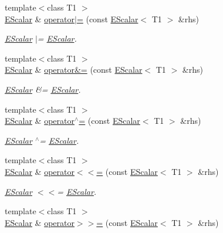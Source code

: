 \begin{DoxyCompactItemize}
{\footnotesize template$<$class T1 $>$ }\\\mbox{\hyperlink{classENSEM_1_1EScalar}{E\+Scalar}} \& \mbox{\hyperlink{classENSEM_1_1EScalar_a95469ba3db6456ae2fa0c6d86d082c0a}{operator$\vert$=}} (const \mbox{\hyperlink{classENSEM_1_1EScalar}{E\+Scalar}}$<$ T1 $>$ \&rhs)
\begin{DoxyCompactList}\small\item\em \mbox{\hyperlink{classENSEM_1_1EScalar}{E\+Scalar}} $\vert$= \mbox{\hyperlink{classENSEM_1_1EScalar}{E\+Scalar}}. \end{DoxyCompactList}\item 
{\footnotesize template$<$class T1 $>$ }\\\mbox{\hyperlink{classENSEM_1_1EScalar}{E\+Scalar}} \& \mbox{\hyperlink{classENSEM_1_1EScalar_a4e16e2cecacdfefd6f01dcc360c6945b}{operator\&=}} (const \mbox{\hyperlink{classENSEM_1_1EScalar}{E\+Scalar}}$<$ T1 $>$ \&rhs)
\begin{DoxyCompactList}\small\item\em \mbox{\hyperlink{classENSEM_1_1EScalar}{E\+Scalar}} \&= \mbox{\hyperlink{classENSEM_1_1EScalar}{E\+Scalar}}. \end{DoxyCompactList}\item 
{\footnotesize template$<$class T1 $>$ }\\\mbox{\hyperlink{classENSEM_1_1EScalar}{E\+Scalar}} \& \mbox{\hyperlink{classENSEM_1_1EScalar_a42c2a63d2eda81643ae8145068db3a8e}{operator$^\wedge$=}} (const \mbox{\hyperlink{classENSEM_1_1EScalar}{E\+Scalar}}$<$ T1 $>$ \&rhs)
\begin{DoxyCompactList}\small\item\em \mbox{\hyperlink{classENSEM_1_1EScalar}{E\+Scalar}} $^\wedge$= \mbox{\hyperlink{classENSEM_1_1EScalar}{E\+Scalar}}. \end{DoxyCompactList}\item 
{\footnotesize template$<$class T1 $>$ }\\\mbox{\hyperlink{classENSEM_1_1EScalar}{E\+Scalar}} \& \mbox{\hyperlink{classENSEM_1_1EScalar_a29ea96dc5698e4541307d65a0f1dfe6e}{operator$<$$<$=}} (const \mbox{\hyperlink{classENSEM_1_1EScalar}{E\+Scalar}}$<$ T1 $>$ \&rhs)
\begin{DoxyCompactList}\small\item\em \mbox{\hyperlink{classENSEM_1_1EScalar}{E\+Scalar}} $<$$<$= \mbox{\hyperlink{classENSEM_1_1EScalar}{E\+Scalar}}. \end{DoxyCompactList}\item 
{\footnotesize template$<$class T1 $>$ }\\\mbox{\hyperlink{classENSEM_1_1EScalar}{E\+Scalar}} \& \mbox{\hyperlink{classENSEM_1_1EScalar_a0e520529327800038c3775d195819b6f}{operator$>$$>$=}} (const \mbox{\hyperlink{classENSEM_1_1EScalar}{E\+Scalar}}$<$ T1 $>$ \&rhs)

\end{DoxyCompactItemize}
